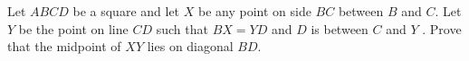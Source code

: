 Let $ABCD$ be a square and let $X$ be any point on side $BC$ between $B$ and $C$. Let $Y$ be the point on line $CD$ such that $BX = YD$ and $D$ is between $C$ and $Y$ . Prove that the midpoint of $XY$ lies on diagonal $BD$.
